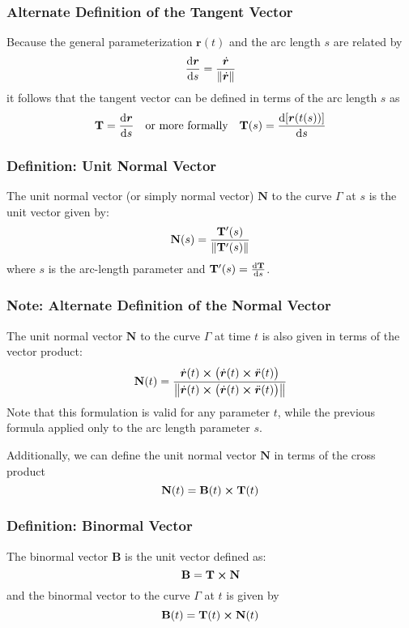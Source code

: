 \documentclass[11pt, a4paper]{article}
\begin{document}
\subsubsection{Alternate Definition of the Tangent Vector}
Because the general parameterization $ \bm{r}(t) $ and the arc length $ s $ are related by
\begin{equation*}
	\dv{\bm{r}}{s} = \frac{\dot{\bm{r}}}{\norm{\dot{\bm{r}}}} 
\end{equation*}
it follows that the tangent vector can be defined in terms of the arc length $ s $ as
\begin{equation*}
	\mathbf{T} = \dv{\bm{r}}{s} \quad \text{or more formally} \quad \mathbf{T}(s) = \dv{[\bm{r}(t(s))]}{s}
\end{equation*}

\subsubsection{Definition: Unit  Normal Vector}
The unit normal vector (or simply normal vector) $ \mathbf{N} $ to the curve $ \Gamma $ at $ s $ is the unit vector given by: 
\begin{equation*}
	\mathbf{N}(s) = \frac{\mathbf{T}'(s)}{\norm{\mathbf{T}'(s)}}
\end{equation*}
where $ s $ is the arc-length parameter and $ \mathbf{T}'(s) = \dv{\mathbf{T}}{s} $.

\subsubsection{Note: Alternate Definition of the Normal Vector}
The unit normal vector $ \mathbf{N} $ to the curve $ \Gamma $ at time $ t $ is also given in terms of the vector product:
\begin{equation*}
	\mathbf{N}(t) = \frac{\dot{\bm{r}}(t) \cross \big (\dot{\bm{r}}(t) \cross \ddot{\bm{r}}(t) \big )}{\norm{\dot{\bm{r}}(t) \cross \big(\dot{\bm{r}}(t) \cross \ddot{\bm{r}}(t) \big)}}
\end{equation*}
Note that this formulation is valid for any parameter $ t $, while the previous formula applied only to the arc length parameter $ s $.

Additionally, we can define the unit normal vector $ \mathbf{N} $ in terms of the cross product
\begin{equation*}
	\mathbf{N}(t) = \mathbf{B}(t) \cross \mathbf{T}(t)
\end{equation*}


\subsubsection{Definition: Binormal Vector}
The binormal vector $ \mathbf{B} $ is the unit vector defined as: 
\begin{equation*}
	\mathbf{B} = \mathbf{T} \cross \mathbf{N}
\end{equation*}
and the binormal vector to the curve $ \Gamma $ at $ t $ is given by
\begin{equation*}
	\mathbf{B}(t) = \mathbf{T}(t) \cross \mathbf{N}(t)
\end{equation*}
\end{document}
